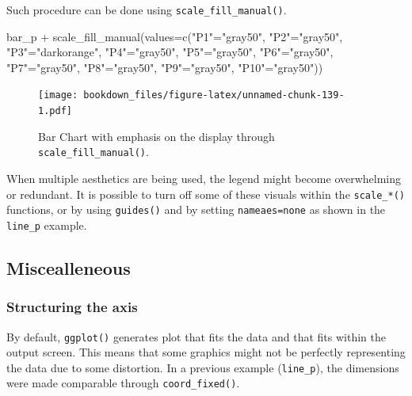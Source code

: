 \documentclass[
]{krantz}
\makeatletter
\newenvironment{Shaded}{\begin{snugshade}}{\end{snugshade}}
\newcommand{\AttributeTok}[1]{\textcolor[rgb]{0.61,0.61,0.61}{#1}}
\newcommand{\FunctionTok}[1]{\textcolor[rgb]{0,0,0}{#1}}
\newcommand{\NormalTok}[1]{#1}
\newcommand{\OtherTok}[1]{\textcolor[rgb]{0.37,0.37,0.37}{#1}}
\newcommand{\SpecialCharTok}[1]{\textcolor[rgb]{0,0,0}{#1}}
\newcommand{\StringTok}[1]{\textcolor[rgb]{0.5,0.5,0.5}{#1}}
\newenvironment{kframe}{%
\medskip{}
\setlength{\fboxsep}{.8em}
 \def\at@end@of@kframe{}%
 \ifinner\ifhmode%
  \def\at@end@of@kframe{\end{minipage}}%
  \begin{minipage}{\columnwidth}%
 \fi\fi%
 \def\FrameCommand##1{\hskip\@totalleftmargin \hskip-\fboxsep
 \colorbox{shadecolor}{##1}\hskip-\fboxsep
     \hskip-\linewidth \hskip-\@totalleftmargin \hskip\columnwidth}%
 \MakeFramed {\advance\hsize-\width
   \@totalleftmargin\z@ \linewidth\hsize
   \@setminipage}}%
 {\par\unskip\endMakeFramed%
 \at@end@of@kframe}
\renewenvironment{Shaded}{\begin{kframe}}{\end{kframe}}
\makeatother
\begin{document}
Such procedure can be done using \texttt{scale\_fill\_manual()}.

\begin{Shaded}
\begin{Highlighting}[]
\NormalTok{bar\_p }\SpecialCharTok{+} 
  \FunctionTok{scale\_fill\_manual}\NormalTok{(}\AttributeTok{values=}\FunctionTok{c}\NormalTok{(}\StringTok{"P1"}\OtherTok{=}\StringTok{"gray50"}\NormalTok{, }\StringTok{"P2"}\OtherTok{=}\StringTok{"gray50"}\NormalTok{, }
                             \StringTok{"P3"}\OtherTok{=}\StringTok{"darkorange"}\NormalTok{, }\StringTok{"P4"}\OtherTok{=}\StringTok{"gray50"}\NormalTok{, }
                             \StringTok{"P5"}\OtherTok{=}\StringTok{"gray50"}\NormalTok{, }\StringTok{"P6"}\OtherTok{=}\StringTok{"gray50"}\NormalTok{,}
                             \StringTok{"P7"}\OtherTok{=}\StringTok{"gray50"}\NormalTok{, }\StringTok{"P8"}\OtherTok{=}\StringTok{"gray50"}\NormalTok{,}
                             \StringTok{"P9"}\OtherTok{=}\StringTok{"gray50"}\NormalTok{, }\StringTok{"P10"}\OtherTok{=}\StringTok{"gray50"}\NormalTok{))}
\end{Highlighting}
\end{Shaded}

\begin{figure}
\centering
\texttt{[image: bookdown\_files/figure-latex/unnamed-chunk-139-1.pdf]}
\caption{\label{fig:unnamed-chunk-139}Bar Chart with emphasis on the display through \texttt{scale\_fill\_manual()}.}
\end{figure}

When multiple aesthetics are being used, the legend might become overwhelming or redundant. It is possible to turn off some of these visuals within the \texttt{scale\_*()} functions, or by using \texttt{guides()} and by setting \texttt{nameaes=\textquotesingle{}none\textquotesingle{}} as shown in the \texttt{line\_p} example.

\hypertarget{miscealleneous}{%
\subsection{Miscealleneous}\label{miscealleneous}}

\hypertarget{structureaxis}{%
\subsubsection*{Structuring the axis}\label{structureaxis}}


By default, \texttt{ggplot()} generates plot that fits the data and that fits within the output screen. This means that some graphics might not be perfectly representing the data due to some distortion. In a previous example (\texttt{line\_p}), the dimensions were made comparable through \texttt{coord\_fixed()}.
\end{document}
